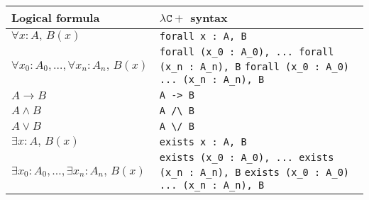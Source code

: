 \documentclass[convert, border=2pt, varwidth=8in]{standalone}
\begin{document}
\begin{tabularx}{\textwidth}{|X|X|}
 \hline
 Logical formula & $\mathtt{\lambda C+}$ syntax \\ 
 \hline
 $\forall x : A, \, B(x)$ & \verb|forall x : A, B| \\ 
 \hline
 $\forall x_0 : A_0, \dots, \forall x_n : A_n, \, B(x)$ & 
  \verb|forall (x_0 : A_0), ... forall (x_n : A_n), B| \newline
  \verb|forall (x_0 : A_0) ... (x_n : A_n), B |
  \\ 
 \hline
 $A \rightarrow B$  & \texttt{A -> B} \\ 
 \hline
 $A \wedge B$ & \verb|A /\ B| \\ 
 \hline
 $A \vee B$ & \verb|A \/ B| \\ 
 \hline
 $\exists x : A, \, B(x)$ & \verb|exists x : A, B| \\ 
 \hline
 $\exists x_0 : A_0, \dots, \exists x_n : A_n, \, B(x)$ & 
  \verb|exists (x_0 : A_0), ... exists (x_n : A_n), B| \newline
  \verb|exists (x_0 : A_0) ... (x_n : A_n), B|
  \\ 
  \hline
\end{tabularx}
\end{document}
